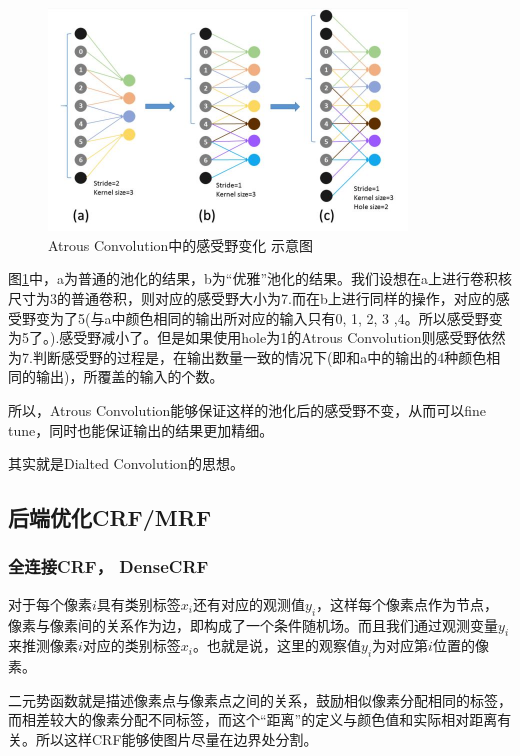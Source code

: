 \begin{figure}[!hbtp]
\centering
\includegraphics[width=0.85\textwidth]{SemanticSLAM/DeepLabAtrousConvolution1.jpg}
\caption{Atrous Convolution中的感受野变化 示意图}
\label{DeepLabAtrousConvolution1}
\end{figure}

图\ref{DeepLabAtrousConvolution1}中，a为普通的池化的结果，b为“优雅”池化的结果。我们设想在a上进行卷积核尺寸为3的普通卷积，则对应的感受野大小为7.而在b上进行同样的操作，对应的感受野变为了5(与a中颜色相同的输出所对应的输入只有0, 1, 2, 3 ,4。所以感受野变为5了。).感受野减小了。但是如果使用hole为1的Atrous Convolution则感受野依然为7.判断感受野的过程是，在输出数量一致的情况下(即和a中的输出的4种颜色相同的输出)，所覆盖的输入的个数。

所以，Atrous Convolution能够保证这样的池化后的感受野不变，从而可以fine tune，同时也能保证输出的结果更加精细。

其实就是Dialted Convolution的思想。

\subsection{后端优化CRF/MRF}

\subsubsection{全连接CRF， DenseCRF}

对于每个像素$i$具有类别标签$x_i$还有对应的观测值$y_i$，这样每个像素点作为节点，像素与像素间的关系作为边，即构成了一个条件随机场。而且我们通过观测变量$y_i$来推测像素$i$对应的类别标签$x_i$。也就是说，这里的观察值$y_i$为对应第$i$位置的像素。

二元势函数就是描述像素点与像素点之间的关系，鼓励相似像素分配相同的标签，而相差较大的像素分配不同标签，而这个“距离”的定义与颜色值和实际相对距离有关。所以这样CRF能够使图片尽量在边界处分割。

